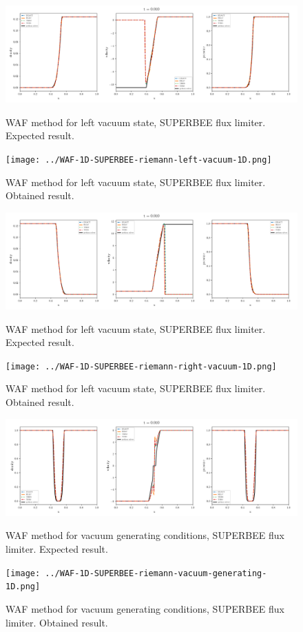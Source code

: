     \begin{figure}[htbp]
        \centering
        \includegraphics[width=.9\textwidth]{./figures/WAF-1D-SUPERBEE-riemann-left-vacuum-1D.png}%
        \caption{WAF method for left vacuum state, SUPERBEE flux limiter. Expected result.}
        \texttt{[image: ../WAF-1D-SUPERBEE-riemann-left-vacuum-1D.png]}
        \caption{WAF method for left vacuum state, SUPERBEE flux limiter. Obtained result.}
    \end{figure}


    \begin{figure}[htbp]
        \centering
        \includegraphics[width=.9\textwidth]{./figures/WAF-1D-SUPERBEE-riemann-right-vacuum-1D.png}%
        \caption{WAF method for left vacuum state, SUPERBEE flux limiter. Expected result.}
        \texttt{[image: ../WAF-1D-SUPERBEE-riemann-right-vacuum-1D.png]}
        \caption{WAF method for left vacuum state, SUPERBEE flux limiter. Obtained result.}
    \end{figure}


    \begin{figure}[htbp]
        \centering
        \includegraphics[width=.9\textwidth]{./figures/WAF-1D-SUPERBEE-riemann-vacuum-generating-1D.png}%
        \caption{WAF method for vacuum generating conditions, SUPERBEE flux limiter. Expected result.}
        \texttt{[image: ../WAF-1D-SUPERBEE-riemann-vacuum-generating-1D.png]}%
        \caption{WAF method for vacuum generating conditions, SUPERBEE flux limiter. Obtained result.}
    \end{figure}










